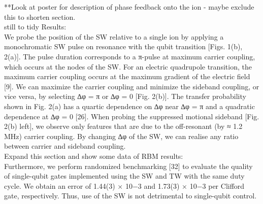 \documentclass[12pt]{iopart}
\begin{document}

    **Look at poster for description of phase feedback onto the ion -
    maybe exclude this to shorten section.\\

    still to tidy Results: \\
    We probe the position of the SW relative to a single ion by applying a
    monochromatic SW pulse on resonance with the qubit transition
    [Figs. 1(b), 2(a)]. The pulse duration corresponds to a π-pulse at
    maximum carrier coupling, which occurs at the nodes of the SW. For an
    electric quadrupole transition, the maximum carrier coupling occurs at
    the maximum gradient of the electric field [9]. We can maximize the
    carrier coupling and minimize the sideband coupling, or vice versa, by
    selecting ∆φ = π or ∆φ = 0 [Fig. 2(b)]. The transfer probability shown
    in Fig. 2(a) has a quartic dependence on ∆φ near ∆φ = π and a
    quadratic dependence at ∆φ = 0 [26]. When probing the suppressed
    motional sideband [Fig. 2(b) left], we observe only features that are
    due to the off-resonant (by ≈ 1.2 MHz) carrier coupling. By changing
    ∆φ of the SW, we can realise any ratio between carrier and sideband
    coupling.\\



    Expand this section and show some data of RBM results:\\
    Furthermore, we perform randomized benchmarking [32] to evaluate
    the quality of single-qubit gates implemented using the SW and TW
    with the same duty cycle. We obtain an error of 1.44(3) × 10−3 and
    1.73(3) × 10−3 per Clifford gate, respectively. Thus, use of the
    SW is not detrimental to single-qubit control. \\
\end{document}

